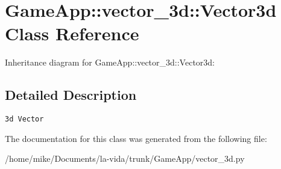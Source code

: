 \hypertarget{classGameApp_1_1vector__3d_1_1Vector3d}{
\section{GameApp::vector\_\-3d::Vector3d Class Reference}
\label{classGameApp_1_1vector__3d_1_1Vector3d}
}
Inheritance diagram for GameApp::vector\_\-3d::Vector3d:

\subsection{Detailed Description}


\footnotesize\begin{verbatim}3d Vector\end{verbatim}
\normalsize
 

The documentation for this class was generated from the following file:\begin{CompactItemize}
\item 
/home/mike/Documents/la-vida/trunk/GameApp/vector\_\-3d.py\end{CompactItemize}
